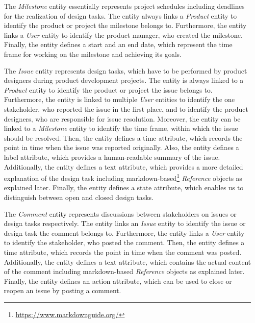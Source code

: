     The \textit{Milestone} entity essentially represents project schedules including deadlines for the realization of design tasks.
    The entity always links a \textit{Product} entity to identify the product or project the milestone belongs to.
    Furthermore, the entity links a \textit{User} entity to identify the product manager, who created the milestone.
    Finally, the entity defines a start and an end date, which represent the time frame for working on the milestone and achieving its goals.

    The \textit{Issue} entity represents design tasks, which have to be performed by product designers during product development projects.
    The entity is always linked to a \textit{Product} entity to identify the product or project the issue belongs to.
    Furthermore, the entity is linked to multiple \textit{User} entities to identify the one stakeholder, who reported the issue in the first place, and to identify the product designers, who are responsible for issue resolution.
    Moreover, the entity can be linked to a \textit{Milestone} entity to identify the time frame, within which the issue should be resolved.
    Then, the entity defines a time attribute, which records the point in time when the issue was reported originally.
    Also, the entity defines a label attribute, which provides a human-readable summary of the issue.
    Additionally, the entity defines a text attribute, which provides a more detailed explanation of the design task including markdown-based\footnote{\url{https://www.markdownguide.org/}} \textit{Reference} objects as explained later.
    Finally, the entity defines a state attribute, which enables us to distinguish between open and closed design tasks.

    The \textit{Comment} entity represents discussions between stakeholders on issues or design tasks respectively.
    The entity links an \textit{Issue} entity to identify the issue or design task the comment belongs to.
    Furthermore, the entity links a \textit{User} entity to identify the stakeholder, who posted the comment.
    Then, the entity defines a time attribute, which records the point in time when the comment was posted.
    Additionally, the entity defines a text attribute, which contains the actual content of the comment including markdown-based \textit{Reference} objects as explained later.
    Finally, the entity defines an action attribute, which can be used to close or reopen an issue by posting a comment.

